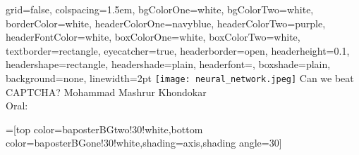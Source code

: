\documentclass[landscape,final,a0paper]{baposter}
\begin{document}
\newlength{\leftimgwidth}
\begin{poster}%
  {
  grid=false,
  colspacing=1.5em,
  bgColorOne=white,
  bgColorTwo=white,
  borderColor=white,
  headerColorOne=navyblue,
  headerColorTwo=purple,
  headerFontColor=white,
 boxColorOne=white,
 boxColorTwo=white,
  textborder=rectangle,
  eyecatcher=true,
  headerborder=open,
  headerheight=0.1\textheight,
  headershape=rectangle,
  headershade=plain,
  headerfont=\Large\textrm, %
  boxshade=plain,
  background=none,
  linewidth=2pt
  }
  {\texttt{[image: neural\_network.jpeg]}} %
  {\sf %
  Can we beat CAPTCHA?}
  {\sf %
  \vspace{1em} 
	Mohammad Mashrur Khondokar\\
	Oral:  \url{}
  }
  { %
  }

  =[top color=baposterBGtwo!30!white,bottom color=baposterBGone!30!white,shading=axis,shading angle=30]

     \setlength{\leftimgwidth}{0.78em+8.0em}

\newcommand{\colouredcircle}[1]{%
      \tikz{\useasboundingbox (-0.2em,-0.32em) rectangle(0.2em,0.32em); \draw[draw=black,fill=baposterBGone!80!black!#1!white,line width=0.03em] (0,0) circle(0.18em);}}


\end{poster}
\end{document}
